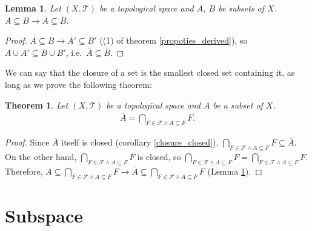 \documentclass{article}%
\theoremstyle{plain}
\newtheorem{theorem}{Theorem}[section] %
\newtheorem{lemma}{Lemma} %
\theoremstyle{definition}
\begin{document}
\begin{lemma}\label{subset_closure}
Let $(X,\mathscr T)$ be a topological space and $A$, $B$ be subsets of $X$.
$A\subseteq B \to \overline A\subseteq \overline B$.
\end{lemma}
\begin{proof}
$A\subseteq B \to A'\subseteq B'$ ((1) of theorem \ref{propoties_derived}), so $A\cup A'\subseteq B\cup B'$, i.e.\ $\overline A\subseteq \overline B$.
\end{proof}

We can say that the closure of a set is the smallest closed set containing it, as long as we prove the following theorem:

\begin{theorem}
Let $(X,\mathscr T)$ be a topological space and $A$ be a subset of $X$.
\begin{align*}
	\overline A = \bigcap_{F\in \mathscr F \wedge A\subseteq F} F.
\end{align*}
\end{theorem}
\begin{proof}
Since $\overline A$ itself is closed (corollary \ref{closure_closed}), $\bigcap_{F\in \mathscr F \wedge A\subseteq F} F \subseteq \overline A$. 
On the other hand, $\bigcap_{F\in \mathscr F \wedge A\subseteq F} F$ is closed, so $\overline{\bigcap_{F\in \mathscr F \wedge A\subseteq F} F} = \bigcap_{F\in \mathscr F \wedge A\subseteq F} F$.
Therefore, $A\subseteq \bigcap_{F\in \mathscr F \wedge A\subseteq F} F \to \overline A \subseteq \bigcap_{F\in \mathscr F \wedge A\subseteq F} F$ (Lemma \ref{subset_closure}). 
\end{proof}

\section{Subspace}
\printindex
\end{document}
